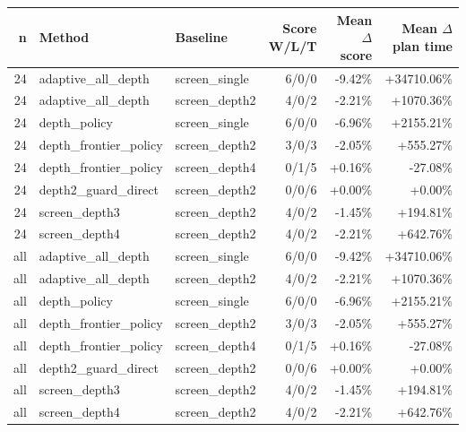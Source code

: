 \begin{tabular}{rllrrr}
\toprule
n & Method & Baseline & Score W/L/T & Mean $\Delta$ score & Mean $\Delta$ plan time \\
\midrule
24 & adaptive\_all\_depth & screen\_single & 6/0/0 & -9.42\% & +34710.06\% \\
24 & adaptive\_all\_depth & screen\_depth2 & 4/0/2 & -2.21\% & +1070.36\% \\
24 & depth\_policy & screen\_single & 6/0/0 & -6.96\% & +2155.21\% \\
24 & depth\_frontier\_policy & screen\_depth2 & 3/0/3 & -2.05\% & +555.27\% \\
24 & depth\_frontier\_policy & screen\_depth4 & 0/1/5 & +0.16\% & -27.08\% \\
24 & depth2\_guard\_direct & screen\_depth2 & 0/0/6 & +0.00\% & +0.00\% \\
24 & screen\_depth3 & screen\_depth2 & 4/0/2 & -1.45\% & +194.81\% \\
24 & screen\_depth4 & screen\_depth2 & 4/0/2 & -2.21\% & +642.76\% \\
all & adaptive\_all\_depth & screen\_single & 6/0/0 & -9.42\% & +34710.06\% \\
all & adaptive\_all\_depth & screen\_depth2 & 4/0/2 & -2.21\% & +1070.36\% \\
all & depth\_policy & screen\_single & 6/0/0 & -6.96\% & +2155.21\% \\
all & depth\_frontier\_policy & screen\_depth2 & 3/0/3 & -2.05\% & +555.27\% \\
all & depth\_frontier\_policy & screen\_depth4 & 0/1/5 & +0.16\% & -27.08\% \\
all & depth2\_guard\_direct & screen\_depth2 & 0/0/6 & +0.00\% & +0.00\% \\
all & screen\_depth3 & screen\_depth2 & 4/0/2 & -1.45\% & +194.81\% \\
all & screen\_depth4 & screen\_depth2 & 4/0/2 & -2.21\% & +642.76\% \\
\bottomrule
\end{tabular}
